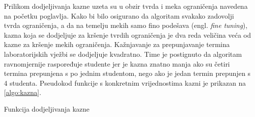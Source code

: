 \documentclass[times, utf8, zavrsni]{fer}
\begin{document}
Prilikom dodjeljivanja kazne uzeta su u obzir tvrda i meka ograničenja navedena na početku poglavlja. Kako bi bilo osigurano
da algoritam svakako zadovolji tvrda ograničenja, a da na temelju mekih samo fino podešava (engl. \textit{fine tuning}), kazna koja
se dodjeljuje za kršenje tvrdih ograničenja je dva reda veličina veća od kazne za kršenje mekih ograničenja. Kažnjavanje
za prepunjavanje termina laboratorijskih vježbi se dodjeljuje kvadratno. Time je postignuto da algoritam ravnomjernije
raspoređuje studente jer je kazna znatno manja ako su četiri termina prepunjena s po jednim studentom, nego ako je
jedan termin prepunjen s 4 studenta. Pseudokod funkcije s konkretnim vrijednostima kazni je prikazan na \ref{algo:kazna}.


\begin{algorithm}
\caption{Funkcija dodjeljivanja kazne}
\label{algo:kazna}
\begin{algorithmic}

  \ENDIF
  \ENDIF
  \ENDIF

\ENDFOR

  \ENDIF
  \ENDIF

\ENDFOR

\end{algorithmic}
\end{algorithm}
\end{document}
